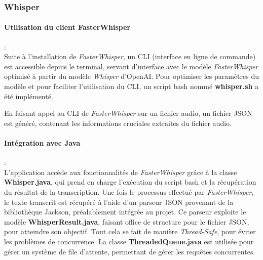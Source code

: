 \subsubsection{Whisper}
\label{sec:whisperImpl}

\paragraph*{Utilisation du client FasterWhisper} : \\
Suite à l'installation de \textit{FasterWhisper}, un CLI (interface en ligne de
commande) est accessible depuis le terminal, servant d'interface avec le modèle
\textit{FasterWhisper} optimisé à partir du modèle \textit{Whisper} d'OpenAI.
Pour optimiser les paramètres du modèle et pour faciliter l’utilisation du CLI,
un script bash nommé \textbf{whisper.sh} a été implémenté.

En faisant appel au CLI de \textit{FasterWhisper} sur un fichier audio, un fichier JSON est généré, contenant les
informations cruciales extraites du fichier audio.

\paragraph*{Intégration avec Java}: \\
L'application accède aux fonctionnalités de \textit{FasterWhisper} grâce à la
classe \textbf{Whisper.java}, qui prend en charge l'exécution du script bash et
la récupération du résultat de la transcription. Une fois le processus effectué
par \textit{FasterWhisper}, le texte transcrit est récupéré à l'aide d'un
parseur JSON provenant de la bibliothèque Jackson, préalablement intégrée au
projet. Ce parseur exploite le modèle \textbf{WhisperResult.java}, faisant
office de structure pour le fichier JSON, pour atteindre son objectif. Tout
cela se fait de manière \textit{Thread-Safe}, pour éviter les problèmes de
concurrence. La classe \textbf{ThreadedQueue.java} est utilisée pour gérer un
système de file d'attente, permettant de gérer les requêtes concurrentes.